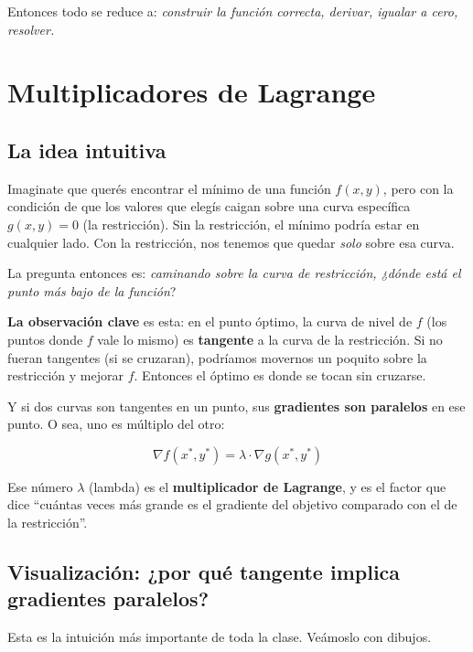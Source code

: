 \documentclass[12pt]{article}
\begin{document}
Entonces todo se reduce a: \textit{construir la función correcta, derivar, igualar a cero, resolver.}

\section{Multiplicadores de Lagrange}

\subsection{La idea intuitiva}

Imaginate que querés encontrar el mínimo de una función $f(x, y)$, pero con la condición de que los valores que elegís caigan sobre una curva específica $g(x, y) = 0$ (la restricción). Sin la restricción, el mínimo podría estar en cualquier lado. Con la restricción, nos tenemos que quedar \textit{solo} sobre esa curva.

\vspace{0.5em}

La pregunta entonces es: \textit{caminando sobre la curva de restricción, ¿dónde está el punto más bajo de la función}?

\vspace{1em}

\textbf{La observación clave} es esta: en el punto óptimo, la curva de nivel de $f$ (los puntos donde $f$ vale lo mismo) es \textbf{tangente} a la curva de la restricción. Si no fueran tangentes (si se cruzaran), podríamos movernos un poquito sobre la restricción y mejorar $f$. Entonces el óptimo es donde se tocan sin cruzarse.

\vspace{0.5em}

Y si dos curvas son tangentes en un punto, sus \textbf{gradientes son paralelos} en ese punto. O sea, uno es múltiplo del otro:

\[
\nabla f(x^*, y^*) = \lambda \cdot \nabla g(x^*, y^*)
\]

Ese número $\lambda$ (lambda) es el \textbf{multiplicador de Lagrange}, y es el factor que dice ``cuántas veces más grande es el gradiente del objetivo comparado con el de la restricción''.

\subsection{Visualización: ¿por qué tangente implica gradientes paralelos?}

Esta es la intuición más importante de toda la clase. Veámoslo con dibujos.
\end{document}
